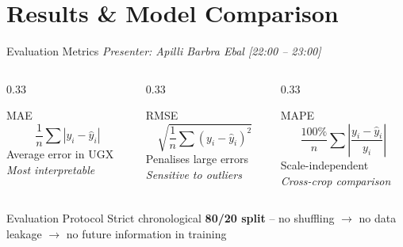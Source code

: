 \documentclass[aspectratio=169,11pt]{beamer}
\begin{document}
\section{Results \& Model Comparison}

\begin{frame}{Evaluation Metrics}
\textit{\small Presenter: Apilli Barbra Ebal \hfill [22:00 -- 23:00]}
\begin{columns}
\begin{column}{0.33\textwidth}
\begin{block}{MAE}
$$\frac{1}{n}\sum|y_i - \hat{y}_i|$$
\centering Average error in UGX\\
\textit{Most interpretable}
\end{block}
\end{column}
\begin{column}{0.33\textwidth}
\begin{block}{RMSE}
$$\sqrt{\frac{1}{n}\sum(y_i - \hat{y}_i)^2}$$
\centering Penalises large errors\\
\textit{Sensitive to outliers}
\end{block}
\end{column}
\begin{column}{0.33\textwidth}
\begin{block}{MAPE}
$$\frac{100\%}{n}\sum\!\left|\frac{y_i - \hat{y}_i}{y_i}\right|$$
\centering Scale-independent\\
\textit{Cross-crop comparison}
\end{block}
\end{column}
\end{columns}

\vspace{0.8em}
\begin{block}{Evaluation Protocol}
\centering
Strict chronological \textbf{80/20 split} -- no shuffling $\rightarrow$ no data leakage $\rightarrow$ no future information in training
\end{block}
\end{frame}
\end{document}
